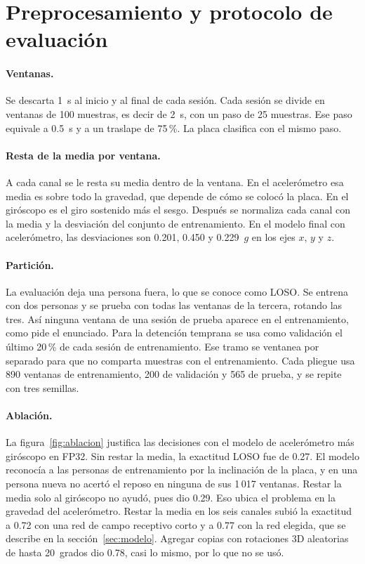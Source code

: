 \documentclass[11pt,a4paper]{article}
\begin{document}
\section{Preprocesamiento y protocolo de evaluación}\label{sec:prepro}

\paragraph{Ventanas.}
Se descarta 1~s al inicio y al final de cada sesión. Cada sesión se divide en ventanas de 100 muestras, es decir de 2~s, con un paso de 25 muestras. Ese paso equivale a 0.5~s y a un traslape de 75\,\%. La placa clasifica con el mismo paso.

\paragraph{Resta de la media por ventana.}
A cada canal se le resta su media dentro de la ventana. En el acelerómetro esa media es sobre todo la gravedad, que depende de cómo se colocó la placa. En el giróscopo es el giro sostenido más el sesgo. Después se normaliza cada canal con la media y la desviación del conjunto de entrenamiento. En el modelo final con acelerómetro, las desviaciones son 0.201, 0.450 y 0.229~$g$ en los ejes $x$, $y$ y $z$.

\paragraph{Partición.}
La evaluación deja una persona fuera, lo que se conoce como LOSO. Se entrena con dos personas y se prueba con todas las ventanas de la tercera, rotando las tres. Así ninguna ventana de una sesión de prueba aparece en el entrenamiento, como pide el enunciado. Para la detención temprana se usa como validación el último 20\,\% de cada sesión de entrenamiento. Ese tramo se ventanea por separado para que no comparta muestras con el entrenamiento. Cada pliegue usa 890 ventanas de entrenamiento, 200 de validación y 565 de prueba, y se repite con tres semillas.

\paragraph{Ablación.}
La figura~\ref{fig:ablacion} justifica las decisiones con el modelo de acelerómetro más giróscopo en FP32. Sin restar la media, la exactitud LOSO fue de 0.27. El modelo reconocía a las personas de entrenamiento por la inclinación de la placa, y en una persona nueva no acertó el reposo en ninguna de sus 1\,017 ventanas. Restar la media solo al giróscopo no ayudó, pues dio 0.29. Eso ubica el problema en la gravedad del acelerómetro. Restar la media en los seis canales subió la exactitud a 0.72 con una red de campo receptivo corto y a 0.77 con la red elegida, que se describe en la sección~\ref{sec:modelo}. Agregar copias con rotaciones 3D aleatorias de hasta 20~grados dio 0.78, casi lo mismo, por lo que no se usó.
\end{document}
